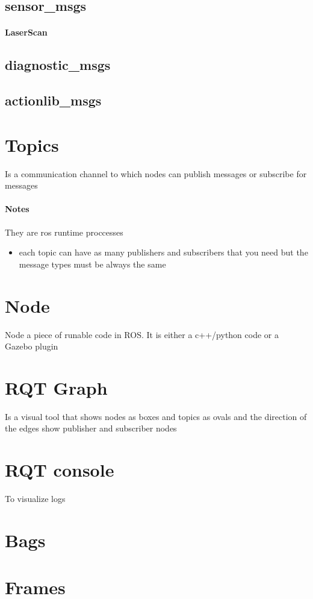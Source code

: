     \subsection{sensor\_msgs}
        \paragraph{LaserScan}
    \subsection{diagnostic\_msgs}
    \subsection{actionlib\_msgs}
\section{Topics}
    Is a communication channel to which nodes can publish messages or subscribe for messages

    \paragraph{Notes}
        They are ros runtime proccesses
        \begin{itemize}
            \item each topic can have as many publishers and subscribers that you need but the message types must be always the same
        \end{itemize}
\section{Node}
    Node a piece of runable code in ROS. It is either a c++/python code or a Gazebo plugin
\section{RQT Graph}
    Is a visual tool that shows nodes as boxes and topics as ovals and the direction of the edges show publisher and subscriber nodes
\section{RQT console}
    To visualize logs
\section{Bags}
\section{Frames}
